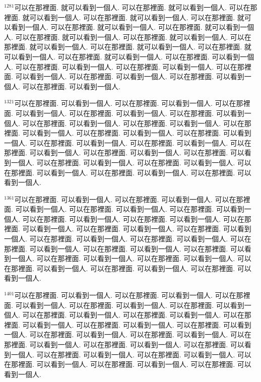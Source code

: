 \documentclass{book}
\begin{document}
$^{1281}$可以在那裡面.
就可以看到一個人.
可以在那裡面.
就可以看到一個人.
可以在那裡面.
就可以看到一個人.
可以在那裡面.
就可以看到一個人.
可以在那裡面.
就可以看到一個人.
可以在那裡面.
就可以看到一個人.
可以在那裡面.
就可以看到一個人.
可以在那裡面.
就可以看到一個人.
可以在那裡面.
就可以看到一個人.
可以在那裡面.
就可以看到一個人.
可以在那裡面.
就可以看到一個人.
可以在那裡面.
就可以看到一個人.
可以在那裡面.
就可以看到一個人.
可以在那裡面.
可以看到一個人.
可以在那裡面.
可以看到一個人.
可以在那裡面.
可以看到一個人.
可以在那裡面.
可以看到一個人.
可以在那裡面.
可以看到一個人.
可以在那裡面.
可以看到一個人.
可以在那裡面.
可以看到一個人.

$^{1321}$可以在那裡面.
可以看到一個人.
可以在那裡面.
可以看到一個人.
可以在那裡面.
可以看到一個人.
可以在那裡面.
可以看到一個人.
可以在那裡面.
可以看到一個人.
可以在那裡面.
可以看到一個人.
可以在那裡面.
可以看到一個人.
可以在那裡面.
可以看到一個人.
可以在那裡面.
可以看到一個人.
可以在那裡面.
可以看到一個人.
可以在那裡面.
可以看到一個人.
可以在那裡面.
可以看到一個人.
可以在那裡面.
可以看到一個人.
可以在那裡面.
可以看到一個人.
可以在那裡面.
可以看到一個人.
可以在那裡面.
可以看到一個人.
可以在那裡面.
可以看到一個人.
可以在那裡面.
可以看到一個人.
可以在那裡面.
可以看到一個人.
可以在那裡面.
可以看到一個人.

$^{1361}$可以在那裡面.
可以看到一個人.
可以在那裡面.
可以看到一個人.
可以在那裡面.
可以看到一個人.
可以在那裡面.
可以看到一個人.
可以在那裡面.
可以看到一個人.
可以在那裡面.
可以看到一個人.
可以在那裡面.
可以看到一個人.
可以在那裡面.
可以看到一個人.
可以在那裡面.
可以看到一個人.
可以在那裡面.
可以看到一個人.
可以在那裡面.
可以看到一個人.
可以在那裡面.
可以看到一個人.
可以在那裡面.
可以看到一個人.
可以在那裡面.
可以看到一個人.
可以在那裡面.
可以看到一個人.
可以在那裡面.
可以看到一個人.
可以在那裡面.
可以看到一個人.
可以在那裡面.
可以看到一個人.
可以在那裡面.
可以看到一個人.
可以在那裡面.
可以看到一個人.

$^{1401}$可以在那裡面.
可以看到一個人.
可以在那裡面.
可以看到一個人.
可以在那裡面.
可以看到一個人.
可以在那裡面.
可以看到一個人.
可以在那裡面.
可以看到一個人.
可以在那裡面.
可以看到一個人.
可以在那裡面.
可以看到一個人.
可以在那裡面.
可以看到一個人.
可以在那裡面.
可以看到一個人.
可以在那裡面.
可以看到一個人.
可以在那裡面.
可以看到一個人.
可以在那裡面.
可以看到一個人.
可以在那裡面.
可以看到一個人.
可以在那裡面.
可以看到一個人.
可以在那裡面.
可以看到一個人.
可以在那裡面.
可以看到一個人.
可以在那裡面.
可以看到一個人.
可以在那裡面.
可以看到一個人.
可以在那裡面.
可以看到一個人.
可以在那裡面.
可以看到一個人.
\end{document}
